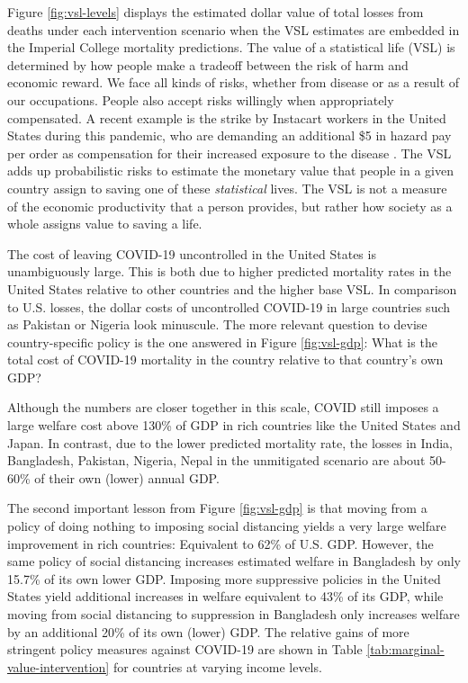 \documentclass[11pt]{article}
\begin{document}
\begin{mdframed}
Figure \ref{fig:vsl-levels} displays the estimated dollar value of total losses from deaths under each intervention scenario when the \textcite{viscusi2017} VSL estimates are embedded in the Imperial College mortality predictions. The value of a statistical life (VSL) is determined by how people make a tradeoff between the risk of harm and  economic reward. We face all kinds of risks, whether from disease or as a result of our occupations. People also accept risks willingly when appropriately compensated. A recent example is the strike by Instacart workers in the United States during this pandemic, who are demanding an additional \$5 in hazard pay per order as compensation for their increased exposure to the disease \parencite{wapo2020}. The VSL adds up probabilistic risks to estimate the monetary value that people in a given country assign to saving one of these \textit{statistical} lives. The VSL is not a measure of the economic productivity that a person provides, but rather how society as a whole assigns value to saving a life.

The cost of leaving COVID-19 uncontrolled in the United States is unambiguously large. This is both due to higher predicted mortality rates in the United States relative to other countries and the higher base VSL. In comparison to U.S. losses, the dollar costs of uncontrolled COVID-19 in large countries such as Pakistan or Nigeria look minuscule. The more relevant question to devise country-specific policy is the one answered in Figure \ref{fig:vsl-gdp}: What is the total cost of COVID-19 mortality in the country relative to that country's own GDP? 

Although the numbers are closer together in this scale, COVID still imposes a large welfare cost above 130\% of GDP in rich countries like the United States and Japan. In contrast, due to the lower predicted mortality rate, the losses in India, Bangladesh, Pakistan, Nigeria, Nepal in the unmitigated scenario are about 50-60\% of their own (lower) annual GDP. 

The second important lesson from Figure \ref{fig:vsl-gdp} is that moving from a policy of doing nothing to imposing social distancing yields a very large welfare improvement in rich countries: Equivalent to 62\% of U.S. GDP. However, the same policy of social distancing increases estimated welfare in Bangladesh by only 15.7\% of its own lower GDP. Imposing more suppressive policies in the United States yield additional increases in welfare equivalent to 43\% of its GDP, while moving from social distancing to suppression in Bangladesh only increases welfare by an additional 20\% of its own (lower) GDP. The relative gains of more stringent policy measures against COVID-19 are shown in Table \ref{tab:marginal-value-intervention} for countries at varying income levels. 


\end{mdframed}
\end{document}
